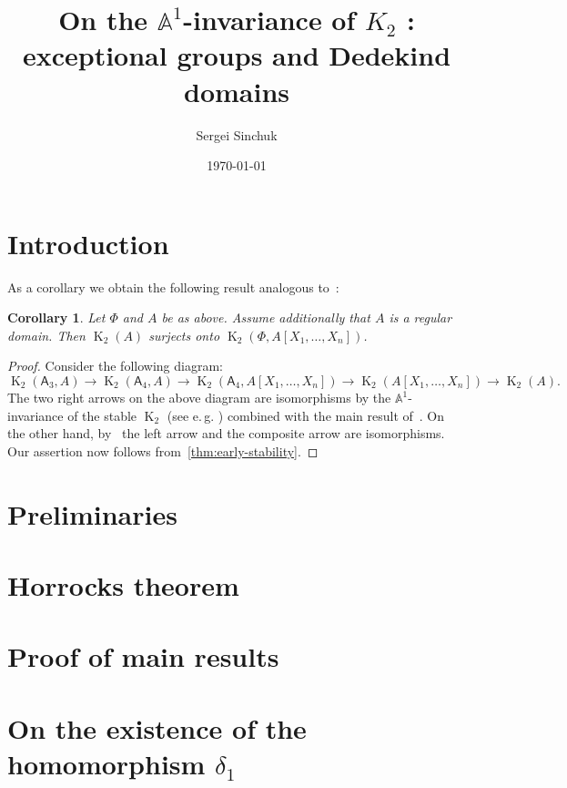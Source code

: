 \documentclass[oneside, 10pt]{amsart}
\title{On the $\mathbb{A}^1$-invariance of $K_2$ \RNum{2}: exceptional groups and Dedekind domains}
\author {Sergei Sinchuk}
\date {\today}
\DeclareMathOperator{\K}{K}
\newcommand{\rA}{\mathsf{A}}
\numberwithin{equation}{section}
\numberwithin{lemma}{section}
\newtheorem{cor}[lemma]{Corollary}
\theoremstyle{definition}
\theoremstyle{remark}
\begin{document}
    \maketitle

    \section{Introduction}\label{sec:introduction}

    As a corollary we obtain the following result analogous to~\cite[Theorem~1.1]{St-Ded}:
    \begin{cor}
        \label{cor:dedekind}
        Let $\Phi$ and $A$ be as above.
        Assume additionally that $A$ is a regular domain.
        Then $\K_2(A)$ surjects onto $\K_2(\Phi, A[X_1,\ldots, X_n])$.
    \end{cor}
    \begin{proof}
        Consider the following diagram:
        \[ \K_2(\rA_3, A) \to \K_2(\rA_4, A) \to \K_2(\rA_4, A[X_1, \ldots, X_n]) \rightarrow \K_2(A[X_1, \ldots, X_n]) \to \K_2(A).\]
        The two right arrows on the above diagram are isomorphisms by the $\mathbb{A}^1$-invariance of the stable $\K_2$
        (see e.\,g. \cite[Theorem~V.6.3]{Kbook}) combined with the main result of~\cite{Tu83}.
        On the other hand, by~\cite[Corollary~3.2]{ST76} the left arrow and the composite arrow are isomorphisms.
        Our assertion now follows from~\cref{thm:early-stability}.
    \end{proof}


    \section{Preliminaries}\label{sec:preliminaries}
    

    \section{Horrocks theorem} \label{sec:horrocks}
    

    \section{Proof of main results} \label{sec:main}
    

    \appendix


    \section{On the existence of the homomorphism $\delta_1$}\label{sec:delta1}
    
\end{document}
